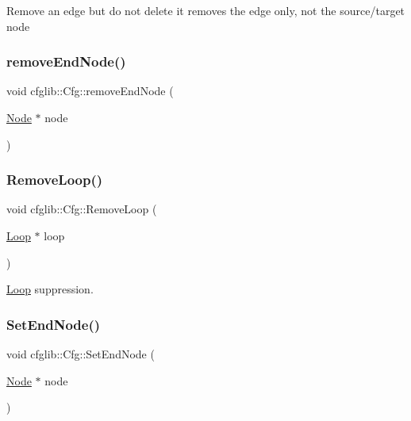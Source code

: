 Remove an edge but do not delete it removes the edge only, not the source/target node \mbox{\label{classcfglib_1_1Cfg_a892063ed55599c1618e49dd31555e7fb}} 
\subsubsection{\texorpdfstring{remove\+End\+Node()}{removeEndNode()}}
{\footnotesize\ttfamily void cfglib\+::\+Cfg\+::remove\+End\+Node (\begin{DoxyParamCaption}\item[{\hyperlink{classcfglib_1_1Node}{Node} $\ast$}]{node }\end{DoxyParamCaption})}

\mbox{\label{classcfglib_1_1Cfg_a4c71befb94beac37921b82361825cc54}} 
\subsubsection{\texorpdfstring{Remove\+Loop()}{RemoveLoop()}}
{\footnotesize\ttfamily void cfglib\+::\+Cfg\+::\+Remove\+Loop (\begin{DoxyParamCaption}\item[{\hyperlink{classcfglib_1_1Loop}{Loop} $\ast$}]{loop }\end{DoxyParamCaption})}

\hyperlink{classcfglib_1_1Loop}{Loop} suppression. \mbox{\label{classcfglib_1_1Cfg_ae235a54ff74dd424c6b5d582ce670c5b}} 
\subsubsection{\texorpdfstring{Set\+End\+Node()}{SetEndNode()}}
{\footnotesize\ttfamily void cfglib\+::\+Cfg\+::\+Set\+End\+Node (\begin{DoxyParamCaption}\item[{\hyperlink{classcfglib_1_1Node}{Node} $\ast$}]{node }\end{DoxyParamCaption})}


